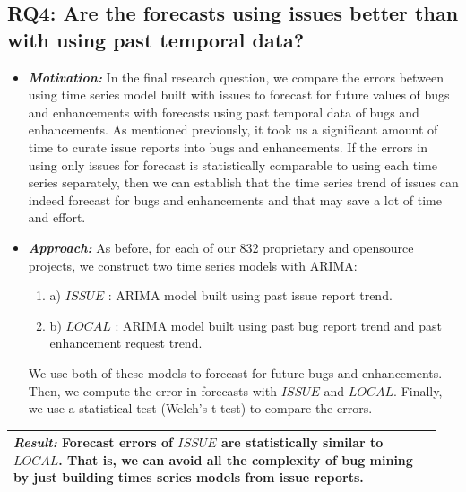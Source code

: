\documentclass[sigconf, preprint]{acmart}
\newcommand{\be}{\begin{enumerate}}
\newcommand{\ee}{\end{enumerate}}
\begin{document}
\subsection*{RQ4: Are the forecasts using issues better than with using past temporal data?}
\begin{itemize}[leftmargin=-1pt]

\item[] \textit{\textbf{Motivation:}} In the final research question, we 
compare the 
errors between using time series model built with issues to 
forecast for future values of bugs and enhancements with forecasts 
using past temporal data of bugs and enhancements. As mentioned previously, it took us a significant amount of time to curate issue reports into bugs and enhancements. If the errors in using only issues for forecast is statistically comparable to using each time series separately, then we can establish that the time series trend of issues can indeed forecast for bugs and enhancements and that may save a lot of time and effort.

\item[] \textit{\textbf{Approach:}} As before, for each of our 832 proprietary 
and 
opensource 
projects, we construct two time series models with ARIMA:
\be
\item[] a) $\mathit{ISSUE}$ : ARIMA model built using past issue report trend.
\item[] b) $\mathit{LOCAL}$ : ARIMA model built using past bug report trend and 
past enhancement request trend.
\ee

We use both of these models to forecast for future bugs and enhancements. 
Then, we compute the error in forecasts with   $\mathit{ISSUE}$ and 
$\mathit{LOCAL}$. Finally, we use a statistical test (Welch's t-test) to 
compare the errors.
 
\end{itemize}

\vspace{1mm}
\noindent\begin{minipage}{\linewidth}
	\begin{center}
		\begin{tabular}{p{0.95\linewidth}}
			\arrayrulecolor{Gray}
			\hline
			 
			\rowcolor{Gray}   \textit{\textbf{Result:}} Forecast errors of 
$\mathit{ISSUE}$ are statistically similar to $\mathit{LOCAL}$. That is, we can avoid all the complexity of bug mining by just building times series models from issue reports. \\\hline
		\end{tabular}
	\end{center}
\end{minipage}\bigstrut[t]
\end{document}
